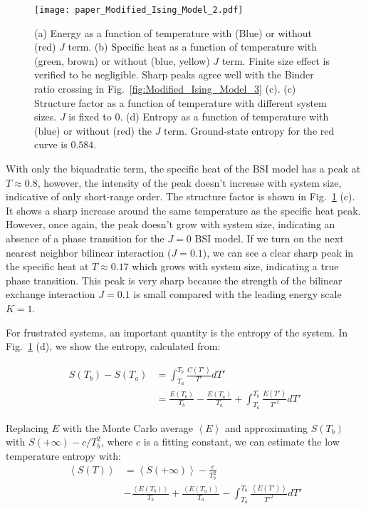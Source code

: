 \documentclass[pra,letterpaper,10pt,twocolumn]{revtex4}
\begin{document}
\begin{figure}[!h]
\texttt{[image: paper\_Modified\_Ising\_Model\_2.pdf]}  
\caption{
(a) Energy as a function of temperature with (Blue) or without (red) $J$
term. (b) Specific heat as a function of temperature with (green, brown)
or without (blue, yellow) $J$ term. Finite size effect is verified to be
negligible. Sharp peaks agree well with the Binder ratio crossing in
Fig.~\ref{fig:Modified_Ising_Model_3} (c). (c) Structure factor as a function of temperature with different system sizes. $J$ is fixed to $0$. (d) Entropy as a function of
temperature with (blue) or without (red) the $J$ term. Ground-state
entropy for the red curve is $0.584$. 
\label{fig:Modified_Ising_Model_2}
}
\end{figure}

With only the biquadratic term, the specific heat of the BSI model has a
peak at $T\approx 0.8$, however, the intensity of the peak doesn't
increase with system size, indicative of only short-range order.  The
structure factor is shown in Fig.~\ref{fig:Modified_Ising_Model_2} (c).
It shows a sharp increase around the same temperature as the specific
heat peak.  However, once again, the peak doesn't grow with system size,
indicating an absence of a phase transition for the $J=0$ BSI model.  If
we turn on the next nearest neighbor bilinear interaction ($J=0.1$), we
can see a clear sharp peak in the specific heat at $T\approx 0.17$ which
grows with system size, indicating a true phase transition.  This peak
is very sharp because the strength of the bilinear exchange interaction
$J=0.1$ is small compared with the leading energy scale $K=1$. 

For frustrated systems, an important quantity is the entropy of the system.
In Fig.~\ref{fig:Modified_Ising_Model_2} (d), we show the
entropy, calculated from:
\begin{small}
\begin{align}
S(T_b)-S(T_a) &=\int^{T_b}_{T_a} \frac{ C(T')}{T'}dT'\nonumber \\
&=\frac{E(T_b)}{T_b} - 
\frac{E(T_a)}{T_a} +
\int^{T_b}_{T_a} \frac{E(T')}{T'^2}dT'
\label{eq:BSI_eq_S}
\end{align}
\end{small}

Replacing $E$ with the Monte Carlo average $\left\langle E
\right\rangle$ and approximating $S(T_b)$ with
$S(+\infty)-c/T^2_b$, where $c$ is a fitting constant, we can
estimate the low temperature entropy with:
\begin{align}
\left\langle S(T) \right\rangle &= \left\langle S(+\infty) \right\rangle -\frac{c}{T^2_b} \nonumber \\
&-\frac{\left\langle E(T_b) \right\rangle}{T_b} + 
\frac{\left\langle E(T_a) \right\rangle}{T_a} - \int^{T_b}_{T_a} \frac{\left\langle E(T') \right\rangle }{T'^2}dT'
\label{eq:BSI_eq_S2}
\end{align}
\end{document}
